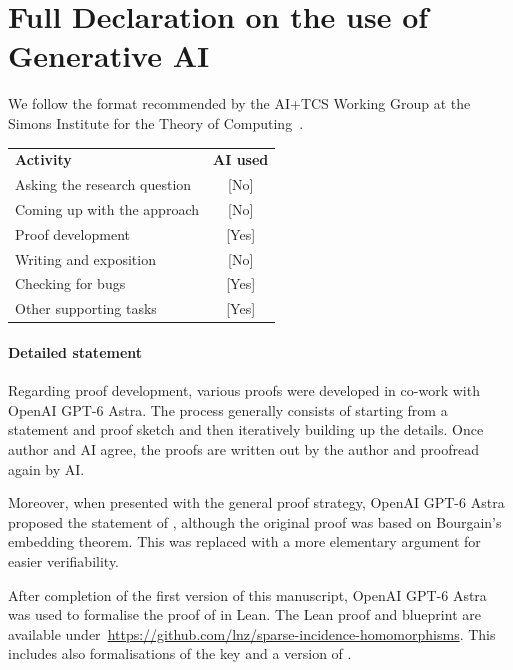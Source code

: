 \documentclass[11pt,letterpaper]{article}
\renewcommand{\arraystretch}{1.0}%
\theoremstyle{definition}
\theoremstyle{remark}
\begin{document}
\section*{Full Declaration on the use of Generative AI}
We follow the format recommended by the AI+TCS Working Group at the Simons Institute for the Theory of Computing~\cite{SimonsInstituteAITCS2026}.
\begin{flushleft}
\renewcommand{\arraystretch}{1.3}
\begin{tabular}{@{}l@{\qquad}c@{}}
\textbf{Activity} & \textbf{AI used} \\
Asking the research question & [No] \\
Coming up with the approach & [No] \\
Proof development & [Yes] \\
Writing and exposition & [No] \\
Checking for bugs & [Yes] \\
Other supporting tasks & [Yes] \\
\end{tabular}
\end{flushleft}

\begin{sloppypar}
\paragraph*{Detailed statement}
Regarding proof development, various proofs were developed in co-work with OpenAI GPT-6 Astra. The process generally consists of starting from a statement and proof sketch and then iteratively building up the details. Once author and AI agree, the proofs are written out by the author and proofread again by AI.


Moreover, when presented with the general proof strategy, OpenAI GPT-6 Astra proposed the statement of , although the original proof was based on Bourgain's embedding theorem. This was replaced with a more elementary argument for easier verifiability.


After completion of the first version of this manuscript, OpenAI GPT-6 Astra was used to formalise the proof of  in Lean. The Lean proof and blueprint are available under~\url{https://github.com/lnz/sparse-incidence-homomorphisms}. This includes also formalisations of the key  and a version of .
\end{sloppypar}
\fi



\end{document}
